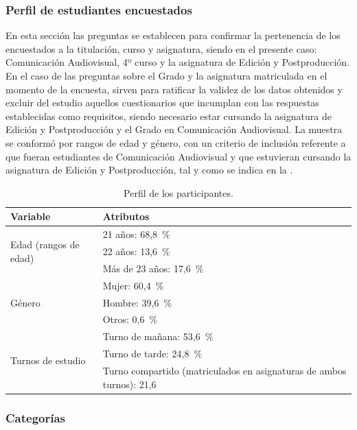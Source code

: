 \documentclass[spanish]{textolivre}
\begin{document}
\subsubsection{Perfil de estudiantes encuestados}\label{sec-organizacao}
En esta sección las preguntas se establecen para confirmar la pertenencia de los encuestados a la titulación, curso y asignatura, siendo en el presente caso: Comunicación Audiovisual, 4º curso y la asignatura de Edición y Postproducción. En el caso de las preguntas sobre el Grado y la asignatura matriculada en el momento de la encuesta, sirven para ratificar la validez de los datos obtenidos y excluir del estudio aquellos cuestionarios que incumplan con las respuestas establecidas como requisitos, siendo necesario estar cursando la asignatura de Edición y Postproducción y el Grado en Comunicación Audiovisual. La muestra se conformó por rangos de edad y género, con un criterio de inclusión referente a que fueran estudiantes de Comunicación Audiovisual y que estuvieran cursando la asignatura de Edición y Postproducción, tal y como se indica en la .

\begin{table}[h]
\centering\small
\begin{threeparttable}
\caption{Perfil de los participantes.}\label{tab-02}
\begin{tabular}{lp{10cm}}
\toprule
Variable & Atributos\\
\midrule
\multirow[t]{3}{*}{Edad (rangos de edad)} & 21 años: 68,8~\% \\
  & 22 años: 13,6~\% \\
  & Más de 23 años: 17,6~\% \\[2ex]
\multirow[t]{3}{*}{Género} & Mujer: 60,4~\% \\
  & Hombre: 39,6~\% \\
  & Otros: 0,6~\% \\[2ex]
\multirow[t]{3}{*}{Turnos de estudio} & Turno de mañana: 53,6~\% \\
  & Turno de tarde: 24,8~\% \\
  & Turno compartido (matriculados en asignaturas de ambos turnos): 21,6\\
\bottomrule
\end{tabular}
\end{threeparttable}
\end{table}

\subsubsection{Categorías}\label{sec-organizacao-latex}
\end{document}
